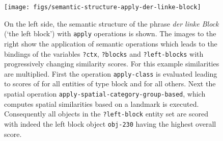 \begin{figure}
\begin{center}
\texttt{[image: figs/semantic-structure-apply-der-linke-block]}
\end{center}
\caption[Lenient categorization semantics]{%
On the left side, the semantic structure of the phrase
\textit{der linke Block} (`the left block') with {\footnotesize\tt apply} operations is shown. The images to
the right show the application of semantic operations which leads to the
bindings of the variables {\footnotesize\tt ?ctx}, {\footnotesize\tt ?blocks} and {\footnotesize\tt ?left-blocks}
with progressively changing similarity scores. For this example similarities are
multiplied. First the operation {\footnotesize\tt apply-class} is evaluated leading to
scores of for all entities of type block and
for all others. Next the spatial operation {\footnotesize\tt apply-spatial-category-group-based}, 
which computes spatial similarities based on a landmark is executed.
Consequently all objects in the {\footnotesize\tt ?left-block} entity set are scored with
indeed the left block object {\footnotesize\tt obj-230} having the highest
overall score.}
\label{f:apply-operations}
\end{figure}

